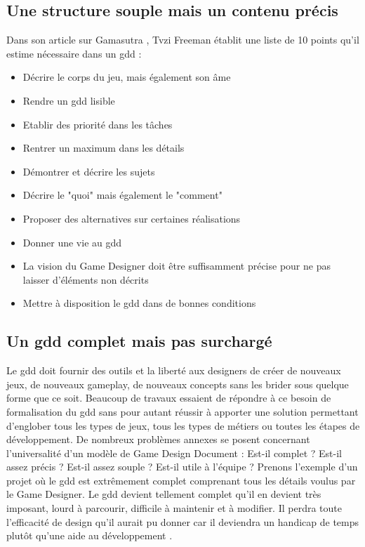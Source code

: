 \subsection{Une structure souple mais un contenu précis}
Dans son article sur Gamasutra \cite{gama_greateGDD}, Tvzi Freeman établit une liste de 10 points qu'il estime nécessaire dans un \gls{gdd} :
\begin{itemize}
    \item Décrire le corps du jeu, mais également son âme
    \item Rendre un \gls{gdd} lisible
    \item Etablir des priorité dans les tâches
    \item Rentrer un maximum dans les détails
    \item Démontrer et décrire les sujets
    \item Décrire le "quoi" mais également le "comment"
    \item Proposer des alternatives sur certaines réalisations
    \item Donner une vie au \gls{gdd}
    \item La vision du Game Designer doit être suffisamment précise pour ne pas laisser d'éléments non décrits
    \item Mettre à disposition le \gls{gdd} dans de bonnes conditions
\end{itemize}

\subsection{Un \gls{gdd} complet mais pas surchargé}
Le \gls{gdd} doit fournir des outils et la liberté aux designers de créer de nouveaux jeux, de nouveaux gameplay, de nouveaux concepts sans les brider sous quelque forme que ce soit. Beaucoup de travaux essaient de répondre à ce besoin de formalisation du \gls{gdd} \cite{GDD_software} \cite{multiview} \cite{GDD_GDProject} \cite{gama_greateGDD} sans pour autant réussir à apporter une solution permettant d'englober tous les types de jeux, tous les types de métiers ou toutes les étapes de développement. De nombreux problèmes annexes se posent concernant l'universalité d'un modèle de Game Design Document : Est-il complet ? Est-il assez précis ? Est-il assez souple ? Est-il utile à l'équipe ? Prenons l'exemple d'un projet où le \gls{gdd} est extrêmement complet comprenant tous les détails voulus par le Game Designer. Le \gls{gdd} devient tellement complet qu'il en devient très imposant, lourd à parcourir, difficile à maintenir et à modifier. Il perdra toute l'efficacité de design qu'il aurait pu donner car il deviendra un handicap de temps plutôt qu'une aide au développement \cite{onepage_librande}.

